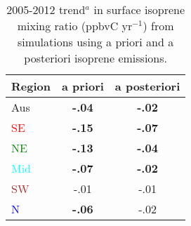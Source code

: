       
      \begin{table}\begin{threeparttable}
        \caption{2005-2012 trend$^{a}$ in surface isoprene mixing ratio (ppbvC yr$^{-1}$) from simulations using a priori and a posteriori isoprene emissions.}
        \begin{tabular}{ l | c  c } 
          \toprule
          Region & a priori & a posteriori \\
          \midrule
          Aus                   & \textbf{-.04} & \textbf{-.02}  \\
          \textcolor{red}{SE}   & \textbf{-.15} & \textbf{-.07}  \\
          \textcolor{green}{NE} & \textbf{-.13} & \textbf{-.04}  \\
          \textcolor{cyan}{Mid} & \textbf{-.07} & \textbf{-.02}  \\
          \textcolor{brown}{SW} & -.01      & -.01  \\
          \textcolor{blue}{N}   & \textbf{-.06} & -.02  \\

\end{tabular}
\end{threeparttable}
\end{table}
